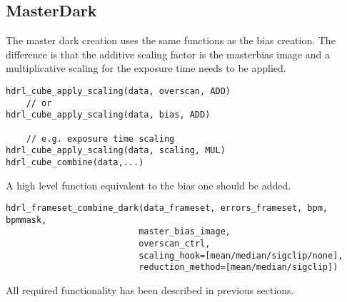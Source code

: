 \subsection{MasterDark}

The master dark creation uses the same functions as the bias creation.  The
difference is that the additive scaling factor is the masterbias image and a
multiplicative scaling for the exposure time needs to be applied.

\begin{verbatim}
hdrl_cube_apply_scaling(data, overscan, ADD)
    // or
hdrl_cube_apply_scaling(data, bias, ADD)

    // e.g. exposure time scaling
hdrl_cube_apply_scaling(data, scaling, MUL)
hdrl_cube_combine(data,...)
\end{verbatim}

A high level function equivalent to the bias one should be added.

\begin{verbatim}
hdrl_frameset_combine_dark(data_frameset, errors_frameset, bpm, bpmmask, 
                          master_bias_image,
                          overscan_ctrl,
                          scaling_hook=[mean/median/sigclip/none],
                          reduction_method=[mean/median/sigclip])
\end{verbatim}

All required functionality has been described in previous sections.

